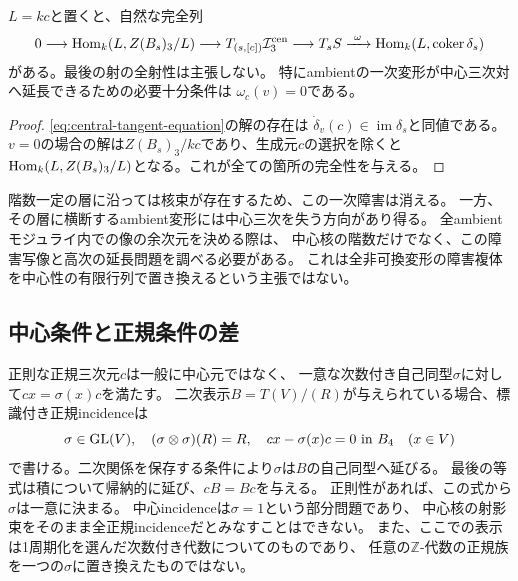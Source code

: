 \begin{proposition}[incidenceの接空間完全列]\label{prop:central-tangent-exact}
$L=kc$と置くと、自然な完全列
\begin{equation}\label{eq:central-tangent-exact-sequence}
\begin{split}
 0\longrightarrow\operatorname{Hom}_k(L,Z(B_s)_3/L)
 \longrightarrow T_{(s,[c])}\mathcal I^{\mathrm{cen}}_3
 \longrightarrow T_sS
 \xrightarrow{\ \omega\ }\operatorname{Hom}_k(L,\operatorname{coker}\delta_s)
\end{split}
\end{equation}
がある。最後の射の全射性は主張しない。
特にambientの一次変形が中心三次対へ延長できるための必要十分条件は
$\omega_c(v)=0$である。
\end{proposition}
\begin{proof}
\eqref{eq:central-tangent-equation}の解の存在は
$\dot\delta_v(c)\in\operatorname{im}\delta_s$と同値である。
$v=0$の場合の解は$Z(B_s)_3/kc$であり、生成元$c$の選択を除くと
$\operatorname{Hom}_k(L,Z(B_s)_3/L)$となる。これが全ての箇所の完全性を与える。
\end{proof}

階数一定の層に沿っては核束が存在するため、この一次障害は消える。
一方、その層に横断するambient変形には中心三次を失う方向があり得る。
全ambientモジュライ内での像の余次元を決める際は、
中心核の階数だけでなく、この障害写像と高次の延長問題を調べる必要がある。
これは全非可換変形の障害複体を中心性の有限行列で置き換えるという主張ではない。

\subsection{中心条件と正規条件の差}
正則な正規三次元$c$は一般に中心元ではなく、
一意な次数付き自己同型$\sigma$に対して$cx=\sigma(x)c$を満たす。
二次表示$B=T(V)/(R)$が与えられている場合、標識付き正規incidenceは
\begin{equation}\label{eq:normal-incidence-equations}
 \sigma\in\mathrm{GL}(V),\quad
 (\sigma\otimes\sigma)(R)=R,\quad
 cx-\sigma(x)c=0\ \text{in }B_4\quad(x\in V)
\end{equation}
で書ける。二次関係を保存する条件により$\sigma$は$B$の自己同型へ延びる。
最後の等式は積について帰納的に延び、$cB=Bc$を与える。
正則性があれば、この式から$\sigma$は一意に決まる。
中心incidenceは$\sigma=1$という部分問題であり、
中心核の射影束をそのまま全正規incidenceだとみなすことはできない。
また、ここでの表示は1周期化を選んだ次数付き代数についてのものであり、
任意の$\mathbb Z$-代数の正規族を一つの$\sigma$に置き換えたものではない。

